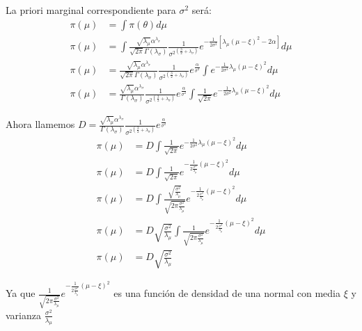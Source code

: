 \documentclass[12pt,]{article}
\begin{document}
La priori marginal correspondiente para \(\sigma^2\) será: \[
\begin{array}{rl}
\pi(\mu) & =\displaystyle \int \pi(\theta)d\mu\\
\pi(\mu) & =\displaystyle \int \frac{\sqrt{\lambda_\mu}\alpha^{\lambda_\sigma}}{\sqrt{2\pi }\Gamma(\lambda_\sigma)}\frac{1}{{\sigma^2}^{(\frac{3}{2}+\lambda_\sigma)}}e^{-\frac{1}{2\sigma^2}[\lambda_\mu(\mu-\xi)^2-2\alpha]}d\mu\\
\pi(\mu) & =\displaystyle \frac{\sqrt{\lambda_\mu}\alpha^{\lambda_\sigma}}{\sqrt{2\pi }\Gamma(\lambda_\sigma)} \frac{1}{{\sigma^2}^{(\frac{3}{2}+\lambda_\sigma)}}e^{\frac{\alpha}{\sigma^2}}\int e^{-\frac{1}{2\sigma^2}\lambda_\mu(\mu-\xi)^2}d\mu\\
\pi(\mu) & =\displaystyle \frac{\sqrt{\lambda_\mu}\alpha^{\lambda_\sigma}}{\Gamma(\lambda_\sigma)} \frac{1}{{\sigma^2}^{(\frac{3}{2}+\lambda_\sigma)}}e^{\frac{\alpha}{\sigma^2}}\int \frac{1}{\sqrt{2\pi }}e^{-\frac{1}{2\sigma^2}\lambda_\mu(\mu-\xi)^2}d\mu
\end{array}
\]

Ahora llamemos
\(D=\frac{\sqrt{\lambda_\mu}\alpha^{\lambda_\sigma}}{\Gamma(\lambda_\sigma)} \frac{1}{{\sigma^2}^{(\frac{3}{2}+\lambda_\sigma)}}e^{\frac{\alpha}{\sigma^2}}\)
\[
\begin{array}{rl}
\pi(\mu) & =\displaystyle D\int \frac{1}{\sqrt{2\pi}}e^{-\frac{1}{2\sigma^2}\lambda_\mu(\mu-\xi)^2}d\mu\\
\pi(\mu) & =\displaystyle D\int \frac{1}{\sqrt{2\pi}}e^{-\frac{1}{2\frac{\sigma^2}{\lambda_\mu}} (\mu-\xi)^2}d\mu\\
\pi(\mu) & =\displaystyle D\int \frac{\sqrt{\frac{\sigma^2}{\lambda_\mu}}}{\sqrt{2\pi\frac{\sigma^2}{\lambda_\mu}}}e^{-\frac{1}{2\frac{\sigma^2}{\lambda_\mu}} (\mu-\xi)^2}d\mu\\
\pi(\mu) & = D\sqrt{\frac{\sigma^2}{\lambda_\mu}} \displaystyle \int \frac{1}{\sqrt{2\pi\frac{\sigma^2}{\lambda_\mu}}}e^{-\frac{1}{2\frac{\sigma^2}{\lambda_\mu}} (\mu-\xi)^2}d\mu\\
\pi(\mu) & = D\sqrt{\frac{\sigma^2}{\lambda_\mu}}
\end{array}
\]

Ya que
\(\frac{1}{\sqrt{2\pi\frac{\sigma^2}{\lambda_\mu}}}e^{-\frac{1}{2\frac{\sigma^2}{\lambda_\mu}} (\mu-\xi)^2}\)
es una función de densidad de una normal con media \(\xi\) y varianza
\(\frac{\sigma^2}{\lambda_\mu}\)
\end{document}
